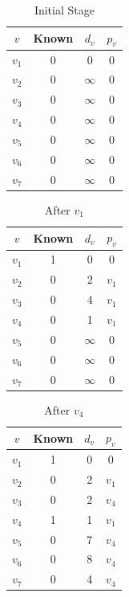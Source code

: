 \begin{minipage}{0.33\textwidth}
\begin{table}[H]
  \centering
  \begin{tabular}{c|c|c|c}
      \toprule
      \(v\) & Known & \(d_v\) & \(p_v\)  \\
    \midrule
      \(v_1\) & 0 & 0 & 0  \\
      \(v_2\) & 0 & \(\infty\) & 0  \\
      \(v_3\) & 0 & \(\infty\) & 0  \\
      \(v_4\) & 0 & \(\infty\) & 0  \\
      \(v_5\) & 0 & \(\infty\) & 0  \\
      \(v_6\) & 0 & \(\infty\) & 0  \\
      \(v_7\) & 0 & \(\infty\) & 0  \\
      \bottomrule
  \end{tabular}
  \caption*{Initial Stage}
\end{table}
\end{minipage}
\begin{minipage}{0.33\textwidth}
\begin{table}[H]
  \centering
  \begin{tabular}{c|c|c|c}
      \toprule
      \(v\) & Known & \(d_v\) & \(p_v\)  \\
    \midrule
      \(v_1\) & 1 & 0 & 0  \\
      \(v_2\) & 0 & 2 & \(v_1\)  \\
      \(v_3\) & 0 & 4 & \(v_1\)  \\
      \(v_4\) & 0 & 1 & \(v_1\)  \\
      \(v_5\) & 0 & \(\infty\) & 0  \\
      \(v_6\) & 0 & \(\infty\) & 0  \\
      \(v_7\) & 0 & \(\infty\) & 0  \\
      \bottomrule
  \end{tabular}
  \caption*{After \(v_1\)}
\end{table}
\end{minipage}
\begin{minipage}{0.33\textwidth}
\begin{table}[H]
  \centering
  \begin{tabular}{c|c|c|c}
      \toprule
      \(v\) & Known & \(d_v\) & \(p_v\)  \\
    \midrule
      \(v_1\) & 1 & 0 & 0  \\
      \(v_2\) & 0 & 2 & \(v_1\)  \\
      \(v_3\) & 0 & 2 & \(v_4\)  \\
      \(v_4\) & 1 & 1 & \(v_1\)  \\
      \(v_5\) & 0 & 7 & \(v_4\)  \\
      \(v_6\) & 0 & 8 & \(v_4\)  \\
      \(v_7\) & 0 & 4 & \(v_4\)  \\
      \bottomrule
  \end{tabular}
  \caption*{After \(v_4\)}
\end{table}
\end{minipage}

